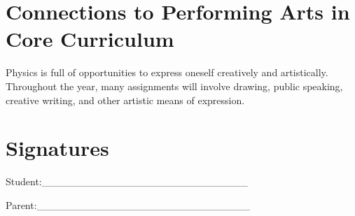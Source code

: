 \documentclass[11pt]{article}
\begin{document}
\section{Connections to Performing Arts in Core Curriculum}
\label{sec:org770d531}
Physics is full of opportunities to express oneself creatively and artistically. Throughout the year, many assignments will involve drawing, public speaking, creative writing, and other artistic means of expression.

\section{Signatures}
\label{sec:orgef4ff00}

Student:\_\_\_\_\_\_\_\_\_\_\_\_\_\_\_\_\_\_\_\_\_\_\_\_\_\_\_\_


Parent:\_\_\_\_\_\_\_\_\_\_\_\_\_\_\_\_\_\_\_\_\_\_\_\_\_\_\_\_\_
\end{document}
